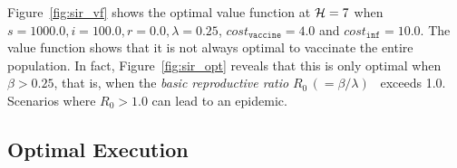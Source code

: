 Figure~\ref{fig:sir_vf} shows the optimal value function at {\footnotesize$ \mathcal{H} = 7 $} when {\footnotesize $ s = 1000.0, i = 100.0, r = 0.0, \lambda = 0.25 $}, {\footnotesize $ cost_{\mathtt{vaccine}} = 4.0$} and {\footnotesize $ cost_{\mathtt{inf}} = 10.0 $}. The value function shows that it is not always optimal to vaccinate the entire population. In fact, 
Figure~\ref{fig:sir_opt} reveals that 
this is only optimal when {\footnotesize $ \beta > 0.25 $}, that is, when the \textit{basic reproductive ratio} {\footnotesize $ R_0 \,(= \beta/\lambda)$}~\cite{Heffernan_2005} exceeds 1.0. 
Scenarios where {\footnotesize $R_0 > 1.0$} can lead to an epidemic. 

\subsection{Optimal Execution}
\label{sec:results_oe}

